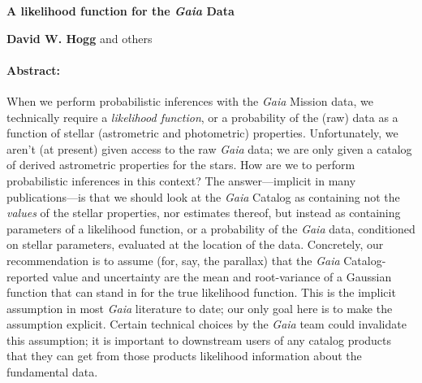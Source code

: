 \documentclass[12pt]{article}
\begin{document}
\noindent
\textbf{A likelihood function for the \textsl{Gaia} Data}
\bigskip

\noindent
\textbf{David W. Hogg} and others

\paragraph{Abstract:}
When we perform probabilistic inferences with the \textsl{Gaia} Mission data,
we technically require
a \emph{likelihood function}, or a probability of the (raw) data as a function
of stellar (astrometric and photometric) properties.
Unfortunately, we aren't (at present) given access to the raw \textsl{Gaia}
data; we are only given a catalog of derived astrometric properties for the stars.
How are we to perform probabilistic inferences in this context?
The answer---implicit in many publications---is that we should look at the
\textsl{Gaia} Catalog as containing not the \emph{values} of the stellar properties,
nor estimates thereof, but instead as containing parameters of a likelihood function, or
a probability of the \textsl{Gaia} data, conditioned on stellar parameters,
evaluated at the location of the data.
Concretely, our recommendation is to assume
(for, say, the parallax) that the \textsl{Gaia} Catalog-reported
value and uncertainty are the mean and root-variance of a Gaussian
function that can stand in for the true likelihood function.
This is the implicit assumption in most \textsl{Gaia} literature to date;
our only goal here is to make the assumption explicit.
Certain technical choices by the \textsl{Gaia} team could invalidate
this assumption; it is important to downstream users of any catalog products
that they can get from those products likelihood information about the fundamental
data.
\end{document}
